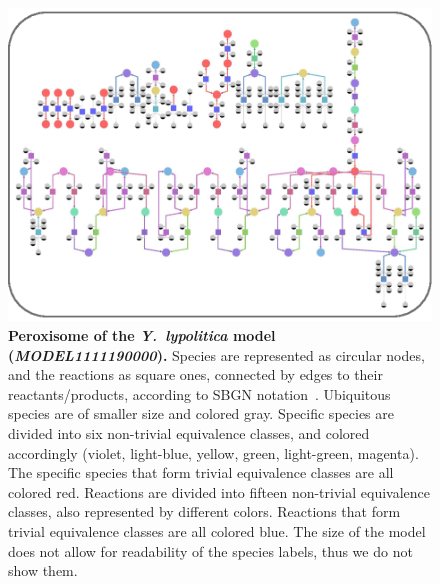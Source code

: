 \documentclass[9pt]{article}
\newcounter{fig}
\newcounter{rm}
\begin{document}
\begin{figure}[th]
\centerline{\includegraphics{Zhukova_Fig_2.eps}}
\vspace*{8pt}
\caption{\textbf{Peroxisome of the \textit{Y.~lypolitica} model (\emph{MODEL1111190000}).} Species are represented as circular nodes, and the reactions as square ones, connected by edges to their reactants/products, according to SBGN notation~\citep{Moodie2011}. Ubiquitous species are of smaller size and colored gray. Specific species are divided into six non-trivial equivalence classes, and colored accordingly (violet, light-blue, yellow, green, light-green, magenta). The specific species that form trivial equivalence classes are all colored red. Reactions are divided into fifteen non-trivial equivalence classes, also represented by different colors. Reactions that form trivial equivalence classes are all colored blue.       
      The size of the model does not allow for readability of the species labels, thus we do not show them.}
\label{fig:bf}
\end{figure}
\end{document}
